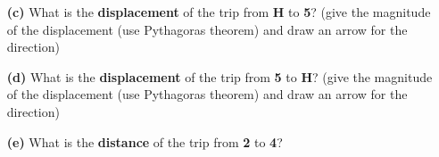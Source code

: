 \documentclass[A4,12pt]{article}
\begin{document}
\begin{enumerate}[label=\bfseries (\arabic*)]
\begin{itemize}
    \item[\bf (c)] What is the \textbf{displacement} of the trip from \textbf{H} to \textbf{5}? (give the magnitude of the displacement (use Pythagoras theorem) and draw an arrow for the direction)
    \item[\bf (d)] What is the \textbf{displacement} of the trip from \textbf{5} to \textbf{H}? (give the magnitude of the displacement (use Pythagoras theorem) and draw an arrow for the direction)
    \item[\bf (e)] What is the \textbf{distance} of the trip from \textbf{2} to \textbf{4}?

\end{itemize}
\end{enumerate}
\end{document}
